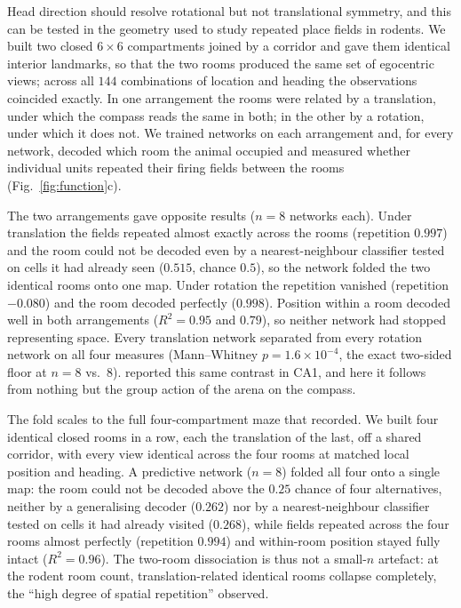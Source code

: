 \documentclass[9pt,lineno]{elife}
\begin{document}
Head direction should resolve rotational but not translational symmetry, and this can be tested
in the geometry used to study repeated place fields in rodents. We built two closed $6\times6$
compartments joined by a corridor and gave them identical interior landmarks, so that the two
rooms produced the same set of egocentric views; across all $144$ combinations of location and
heading the observations coincided exactly. In one arrangement the rooms were related by a
translation, under which the compass reads the same in both; in the other by a rotation, under
which it does not. We trained networks on each arrangement and, for every network, decoded which
room the animal occupied and measured whether individual units repeated their firing fields
between the rooms (Fig.~\ref{fig:function}c).

The two arrangements gave opposite results ($n=8$ networks each). Under translation the fields
repeated almost exactly across the rooms (repetition $0.997$) and the room could not be decoded
even by a nearest-neighbour classifier tested on cells it had already seen ($0.515$, chance
$0.5$), so the network folded the two identical rooms onto one map. Under rotation the
repetition vanished (repetition $-0.080$) and the room decoded perfectly ($0.998$). Position
within a room decoded well in both arrangements ($R^2 = 0.95$ and $0.79$), so neither network
had stopped representing space. Every translation network separated from every rotation network
on all four measures (Mann--Whitney $p = 1.6\times10^{-4}$, the exact two-sided floor at $n=8$
vs.\ $8$). \citet{grieves2016} reported this same contrast in CA1, and here it follows from
nothing but the group action of the arena on the compass.

The fold scales to the full four-compartment maze that \citet{spiers2015} recorded. We built four
identical closed rooms in a row, each the translation of the last, off a shared corridor, with
every view identical across the four rooms at matched local position and heading. A predictive
network ($n=8$) folded all four onto a single map: the room could not be decoded above the $0.25$
chance of four alternatives, neither by a generalising decoder ($0.262$) nor by a
nearest-neighbour classifier tested on cells it had already visited ($0.268$), while fields
repeated across the four rooms almost perfectly (repetition $0.994$) and within-room position
stayed fully intact ($R^2 = 0.96$). The two-room dissociation is thus not a small-$n$ artefact: at
the rodent room count, translation-related identical rooms collapse completely, the
``high degree of spatial repetition'' \citet{spiers2015} observed.
\end{document}
